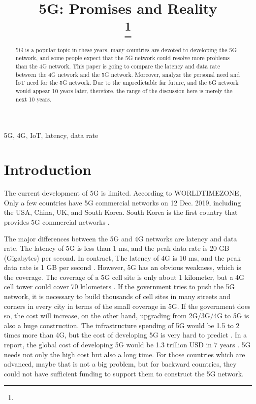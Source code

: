 \documentclass[conference]{IEEEtran}
\begin{document}
\title{5G: Promises and Reality\\
{\footnotesize \textsuperscript{}}
\thanks{}
}

\author{
}

\maketitle

\begin{abstract}
5G is a popular topic in these years, many countries are devoted to developing the 5G network, and some people expect that the 5G network could resolve more problems than the 4G network. This paper is going to compare the latency and data rate between the 4G network and the 5G network. Moreover, analyze the personal need and IoT need for the 5G network. Due to the unpredictable far future, and the 6G network would appear 10 years later, therefore, the range of the discussion here is merely the next 10 years.
\end{abstract}

\begin{IEEEkeywords}
5G, 4G, IoT, latency, data rate
\end{IEEEkeywords}

\section{Introduction}
The current development of 5G is limited. According to WORLDTIMEZONE, Only a few countries have 5G commercial networks on 12 Dec. 2019, including the USA, China, UK, and South Korea. South Korea is the first country that provides 5G commercial networks \cite{1}.

The major differences between the 5G and 4G networks are latency and data rate. The latency of 5G is less than 1 ms, and the peak data rate is 20 GB (Gigabytes) per second. In contract, The latency of 4G is 10 ms, and the peak data rate is 1 GB per second \cite{2}. However, 5G has an obvious weakness, which is the coverage. The coverage of a 5G cell site is only about 1 kilometer, but a 4G cell tower could cover 70 kilometers \cite{3}. If the government tries to push the 5G network, it is necessary to build thousands of cell sites in many streets and corners in every city in terms of the small coverage in 5G. If the government does so, the cost will increase, on the other hand, upgrading from 2G/3G/4G to 5G is also a huge construction. The infrastructure spending of 5G would be 1.5 to 2 times more than 4G, but the cost of developing 5G is very hard to predict \cite{15}. In a report, the global cost of developing 5G would be 1.3 trillion USD in 7 years \cite{16}. 5G needs not only the high cost but also a long time. For those countries which are advanced, maybe that is not a big problem, but for backward countries, they could not have sufficient funding to support them to construct the 5G network.
\end{document}
